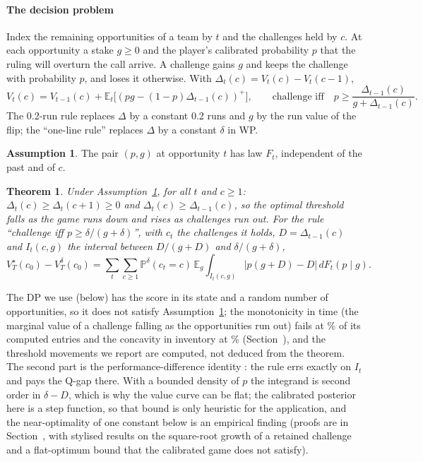 \documentclass[aoas]{imsart}
\theoremstyle{plain}
\newtheorem{theorem}{Theorem}
\theoremstyle{definition}
\newtheorem{assumption}{Assumption}
\newcommand{\E}{\mathbb{E}}
\newcommand{\Prob}{\mathbb{P}}
\begin{document}
\paragraph{The decision problem} Index the remaining opportunities of a team by $t$ and the challenges held by $c$. At
each opportunity a stake $g\ge0$ and the player's calibrated probability $p$ that the ruling will overturn the call
arrive. A challenge gains $g$ and keeps the challenge with probability $p$, and loses it otherwise. With
$\Delta_t(c)=V_t(c)-V_t(c-1)$,
\begin{equation}\label{eq:bellman}
V_t(c) = V_{t-1}(c) + \E_t\bigl[(pg-(1-p)\Delta_{t-1}(c))^+\bigr],\qquad
\text{challenge iff}\quad p \ge \frac{\Delta_{t-1}(c)}{g+\Delta_{t-1}(c)} .
\end{equation}
The 0.2-run rule replaces $\Delta$ by a constant 0.2 runs and $g$ by the run value of the flip; the ``one-line rule''
replaces $\Delta$ by a constant $\delta$ in WP.
\begin{assumption}\label{ass:exo}
The pair $(p,g)$ at opportunity $t$ has law $F_t$, independent of the past and of $c$.
\end{assumption}
\begin{theorem}\label{thm:mono}
Under Assumption~\ref{ass:exo}, for all $t$ and $c\ge1$: $\Delta_t(c)\ge\Delta_t(c+1)\ge0$ and
$\Delta_t(c)\ge\Delta_{t-1}(c)$, so the optimal threshold falls as the game runs down and rises as challenges run out.
For the rule ``challenge iff $p\ge\delta/(g+\delta)$'', with $c_t$ the challenges it holds,
$D=\Delta_{t-1}(c)$ and $I_t(c,g)$ the interval between $D/(g+D)$ and $\delta/(g+\delta)$,
\[ V^\star_T(c_0)-V^{\delta}_T(c_0)=\sum_t\sum_{c\ge1}\Prob^\delta(c_t=c)\,\E_g\!\int_{I_t(c,g)}|p(g+D)-D|\,dF_t(p\mid g). \]
\end{theorem}
\noindent The DP we use (below) has the score in its state and a random number of opportunities, so it does not satisfy
Assumption~\ref{ass:exo}; the monotonicity in time (the marginal value of a challenge falling as the opportunities run out) fails at
\DPRiseEntPct\% of its computed entries and the concavity in inventory at \DPConcEntPct\% (Section~), and the threshold movements we report are computed, not deduced from the theorem. The
second part is the performance-difference identity \citep{KakadeLangford2002}: the rule errs exactly on
$I_t$ and pays the Q-gap there. With a bounded density of $p$ the integrand is second order in $\delta-D$, which is why
the value curve can be flat; the calibrated posterior here is a step function, so that bound is only heuristic for the
application, and the near-optimality of one constant below is an empirical finding (proofs are in
Section~, with stylised results on the square-root growth of a retained challenge and a flat-optimum
bound that the calibrated game does not satisfy).
\end{document}
